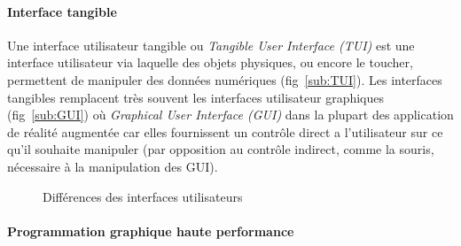 \paragraph{Interface tangible}
Une interface utilisateur tangible ou \emph{Tangible User Interface (TUI)} est une interface utilisateur via laquelle des objets physiques, ou encore le toucher, permettent de manipuler des données numériques (fig~\ref{sub:TUI}). Les interfaces tangibles remplacent très souvent les interfaces utilisateur graphiques (fig~\ref{sub:GUI}) où \emph{Graphical User Interface (GUI)} dans la plupart des application de réalité augmentée car elles fournissent un contrôle direct a l'utilisateur sur ce qu'il souhaite manipuler (par opposition au contrôle indirect, comme la souris, nécessaire à la manipulation des GUI).

\begin{figure}[h]
    \centering
\caption{Différences des interfaces utilisateurs}
\label{fig:GUITUI}
\end{figure}


\paragraph{Programmation graphique haute performance}
